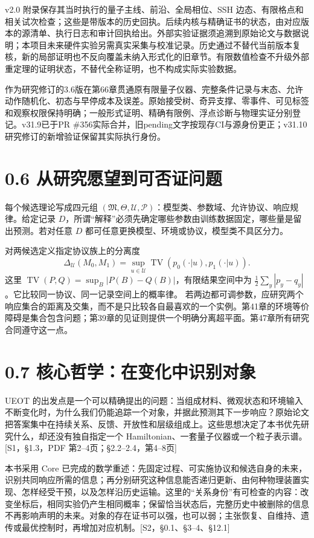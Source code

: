 \documentclass[
  11pt,
  oneside]{book}
\begin{document}
v2.0 附录保存其当时执行的量子主线、前沿、全局相位、SSH
边态、有限格点和相关试次检查；这些是带版本的历史回执。后续内核与精确证书的状态，由对应版本的源清单、执行日志和审计回执给出。外部实验证据须追溯到原始论文与数据说明；本项目未来硬件实验另需真实采集与校准记录。历史通过不替代当前版本复核，新的局部证明也不反向覆盖未纳入形式化的旧章节。有限数值检查不升级外部重定理的证明状态，不替代全称证明，也不构成实际实验数据。

作为研究修订的3.6版在第66章贯通原有限量子仪器、完整条件记录与末态、允许动作随机化、初态与早停成本及误差。原始接受树、奇异支撑、零事件、可见标签和观察权限保持明确；一般形式证明、精确有限例、浮点诊断与物理实证分别登记。v31.9已于PR
\#356实际合并，旧pending文字按现存CI与源身份更正；v31.10研究修订的新增验证保留其实际执行身份。

\section{0.6 从研究愿望到可否证问题}

每个候选理论写成四元组
\((\mathfrak M,\Theta,\mathcal U,\mathcal P)\)：模型类、参数域、允许协议、响应规律。给定记录
\(D\)，所谓``解释''必须先确定哪些参数由训练数据固定，哪些量是留出预测。若对任意
\(D\) 都可任意更换模型、环境或协议，模型类不具区分力。

对两候选定义指定协议族上的分离度 \[
\Delta_{\mathcal U}(M_0,M_1)
=\sup_{u\in\mathcal U}\operatorname{TV}(p_0(\cdot|u),p_1(\cdot|u)).
\] 这里 \(\operatorname{TV}(P,Q)=\sup_B|P(B)-Q(B)|\)，有限结果空间中为
\(\tfrac12\sum_y|p_y-q_y|\)。它比较同一协议、同一记录空间上的概率律。
若两边都可调参数，应研究两个响应集合的距离及交集，而不是只比较各自最喜欢的一个实例。第41章的环境等价障碍是集合包含问题；第39章的见证则提供一个明确分离超平面。第47章所有研究合同遵守这一点。

\section{0.7 核心哲学：在变化中识别对象}

UEOT
的出发点是一个可以精确提出的问题：当组成材料、微观状态和环境输入不断变化时，为什么我们仍能追踪一个对象，并据此预测其下一步响应？原始论文把答案集中在持续关系、反馈、开放性和层级组成上。这些思想决定了本书优先研究什么，却还没有独自指定一个
Hamiltonian、一套量子仪器或一个粒子表示谱。{[}S1，§1.3，PDF
第2--4页；§2.2--2.4，第4--8页{]}

本书采用 Core
已完成的数学重述：先固定过程、可实施协议和候选自身的未来，识别共同响应所需的信息；再分别研究这种信息能否递归更新、由何种物理装置实现、怎样经受干预，以及怎样沿历史运输。这里的``关系身份''有可检查的内容：改变坐标后，相同实验仍产生相同概率；保留恰当状态后，完整历史中被删除的信息不再影响声明的未来。对象的存在证书可以强，也可以弱；主张恢复、自维持、遗传或最优控制时，再增加对应机制。{[}S2，§0.1、§3--4、§12.1{]}
\end{document}
